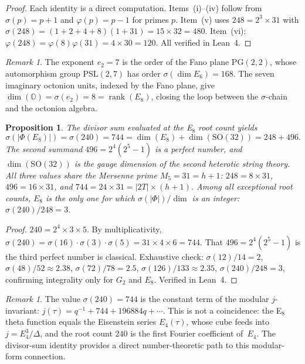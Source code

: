 \documentclass[11pt]{amsart}
\theoremstyle{plain}
\newtheorem{proposition}[theorem]{Proposition}
\theoremstyle{definition}
\theoremstyle{remark}
\newtheorem{remark}[theorem]{Remark}
\renewcommand{\Phi}{\varPhi}
\newcommand{\rank}{\operatorname{rank}}
\begin{document}
\begin{proof}
Each identity is a direct computation.  Items~(i)--(iv) follow from
$\sigma(p) = p+1$ and $\varphi(p) = p-1$ for primes $p$.  Item~(v)
uses $248 = 2^3 \times 31$ with $\sigma(248) = (1+2+4+8)(1+31) = 15 \times 32 = 480$.
Item~(vi): $\varphi(248) = \varphi(8)\varphi(31) = 4 \times 30 = 120$.
All verified in Lean~4.
\end{proof}

\begin{remark}\label{rem:fano-octonion}
The exponent $e_2 = 7$ is the order of the Fano plane $\mathrm{PG}(2,2)$,
whose automorphism group $\mathrm{PSL}(2,7)$ has order
$\sigma(\dim E_6) = 168$.  The seven imaginary octonion units, indexed
by the Fano plane, give $\dim(\mathbb{O}) = \sigma(e_2) = 8 = \rank(E_8)$,
closing the loop between the $\sigma$-chain and the octonion algebra.
\end{remark}

\begin{proposition}\label{prop:sigma-roots}
The divisor sum evaluated at the E$_8$ root count yields
\[
  \sigma(|\Phi(E_8)|) = \sigma(240) = 744 = \dim(E_8) + \dim(\mathrm{SO}(32))
  = 248 + 496.
\]
The second summand $496 = 2^4(2^5-1)$ is a perfect number, and
$\dim(\mathrm{SO}(32))$ is the gauge dimension of the second heterotic
string theory.  All three values share the Mersenne prime $M_5 = 31 = h + 1$:
$248 = 8 \times 31$, $496 = 16 \times 31$, and
$744 = 24 \times 31 = |2T| \times (h+1)$.
Among all exceptional root counts, $E_8$ is the only one for which
$\sigma(|\Phi|)/\dim$ is an integer: $\sigma(240)/248 = 3$.
\end{proposition}

\begin{proof}
$240 = 2^4 \times 3 \times 5$.  By multiplicativity,
$\sigma(240) = \sigma(16) \cdot \sigma(3) \cdot \sigma(5)
= 31 \times 4 \times 6 = 744$.
That $496 = 2^4(2^5 - 1)$ is the third perfect number is classical.
Exhaustive check: $\sigma(12)/14 = 2$, $\sigma(48)/52 \approx 2.38$,
$\sigma(72)/78 = 2.5$, $\sigma(126)/133 \approx 2.35$,
$\sigma(240)/248 = 3$, confirming integrality only for $G_2$ and $E_8$.
Verified in Lean~4.
\end{proof}

\begin{remark}\label{rem:j-invariant}
The value $\sigma(240) = 744$ is the constant term of the modular
$j$-invariant: $j(\tau) = q^{-1} + 744 + 196884q + \cdots$.
This is not a coincidence: the E$_8$ theta function equals the
Eisenstein series $E_4(\tau)$, whose cube feeds into
$j = E_4^3/\Delta$, and the root count $240$ is the first Fourier
coefficient of~$E_4$.  The divisor-sum identity provides a direct
number-theoretic path to this modular-form connection.
\end{remark}
\end{document}
